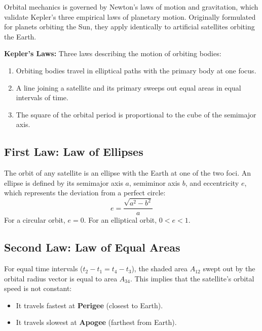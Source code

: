 \documentclass[12pt,a4paper]{article}
\begin{document}
Orbital mechanics is governed by Newton's laws of motion and gravitation, which validate Kepler's three empirical laws of planetary motion. Originally formulated for planets orbiting the Sun, they apply identically to artificial satellites orbiting the Earth.

\begin{tcolorbox}[defbox]
\textbf{Kepler's Laws:} Three laws describing the motion of orbiting bodies:
\begin{enumerate}[label=\textbf{\arabic*.}, leftmargin=*, noitemsep, topsep=2pt]
  \item Orbiting bodies travel in elliptical paths with the primary body at one focus.
  \item A line joining a satellite and its primary sweeps out equal areas in equal intervals of time.
  \item The square of the orbital period is proportional to the cube of the semimajor axis.
\end{enumerate}
\end{tcolorbox}

\subsection{First Law: Law of Ellipses}
The orbit of any satellite is an ellipse with the Earth at one of the two foci. An ellipse is defined by its semimajor axis $a$, semiminor axis $b$, and eccentricity $e$, which represents the deviation from a perfect circle:
\begin{equation}
  e = \frac{\sqrt{a^2 - b^2}}{a}
\end{equation}
For a circular orbit, $e = 0$. For an elliptical orbit, $0 < e < 1$.

\subsection{Second Law: Law of Equal Areas}
For equal time intervals ($t_2 - t_1 = t_4 - t_3$), the shaded area $A_{12}$ swept out by the orbital radius vector is equal to area $A_{34}$. This implies that the satellite's orbital speed is not constant:
\begin{itemize}[leftmargin=*, noitemsep]
  \item It travels fastest at \textbf{Perigee} (closest to Earth).
  \item It travels slowest at \textbf{Apogee} (farthest from Earth).
\end{itemize}
\end{document}
